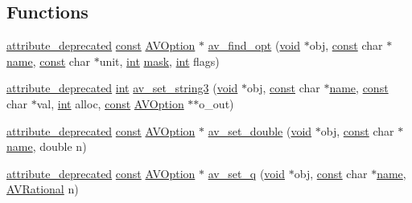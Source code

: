 \subsection*{Functions}
\begin{DoxyCompactItemize}
\item 
\hyperlink{attributes_8h_aa6d076561d3a9eea4729ee632652de02}{attribute\+\_\+deprecated} \hyperlink{getopt1_8c_a2c212835823e3c54a8ab6d95c652660e}{const} \hyperlink{struct_a_v_option}{A\+V\+Option} $\ast$ \hyperlink{group__avoptions_gaa24cb225a282495b9f44377faac5b73f}{av\+\_\+find\+\_\+opt} (\hyperlink{sound_8c_ae35f5844602719cf66324f4de2a658b3}{void} $\ast$obj, \hyperlink{getopt1_8c_a2c212835823e3c54a8ab6d95c652660e}{const} char $\ast$\hyperlink{lib_2expat_8h_a1b49b495b59f9e73205b69ad1a2965b0}{name}, \hyperlink{getopt1_8c_a2c212835823e3c54a8ab6d95c652660e}{const} char $\ast$unit, \hyperlink{xmltok_8h_a5a0d4a5641ce434f1d23533f2b2e6653}{int} \hyperlink{structmask}{mask}, \hyperlink{xmltok_8h_a5a0d4a5641ce434f1d23533f2b2e6653}{int} flags)
\item 
\hyperlink{attributes_8h_aa6d076561d3a9eea4729ee632652de02}{attribute\+\_\+deprecated} \hyperlink{xmltok_8h_a5a0d4a5641ce434f1d23533f2b2e6653}{int} \hyperlink{group__avoptions_gaef3d3cd17236e8a38d95c8a13031ba80}{av\+\_\+set\+\_\+string3} (\hyperlink{sound_8c_ae35f5844602719cf66324f4de2a658b3}{void} $\ast$obj, \hyperlink{getopt1_8c_a2c212835823e3c54a8ab6d95c652660e}{const} char $\ast$\hyperlink{lib_2expat_8h_a1b49b495b59f9e73205b69ad1a2965b0}{name}, \hyperlink{getopt1_8c_a2c212835823e3c54a8ab6d95c652660e}{const} char $\ast$val, \hyperlink{xmltok_8h_a5a0d4a5641ce434f1d23533f2b2e6653}{int} alloc, \hyperlink{getopt1_8c_a2c212835823e3c54a8ab6d95c652660e}{const} \hyperlink{struct_a_v_option}{A\+V\+Option} $\ast$$\ast$o\+\_\+out)
\item 
\hyperlink{attributes_8h_aa6d076561d3a9eea4729ee632652de02}{attribute\+\_\+deprecated} \hyperlink{getopt1_8c_a2c212835823e3c54a8ab6d95c652660e}{const} \hyperlink{struct_a_v_option}{A\+V\+Option} $\ast$ \hyperlink{group__avoptions_ga931434cfd1e6b54bcd3152c0c417b306}{av\+\_\+set\+\_\+double} (\hyperlink{sound_8c_ae35f5844602719cf66324f4de2a658b3}{void} $\ast$obj, \hyperlink{getopt1_8c_a2c212835823e3c54a8ab6d95c652660e}{const} char $\ast$\hyperlink{lib_2expat_8h_a1b49b495b59f9e73205b69ad1a2965b0}{name}, double n)
\item 
\hyperlink{attributes_8h_aa6d076561d3a9eea4729ee632652de02}{attribute\+\_\+deprecated} \hyperlink{getopt1_8c_a2c212835823e3c54a8ab6d95c652660e}{const} \hyperlink{struct_a_v_option}{A\+V\+Option} $\ast$ \hyperlink{group__avoptions_gacbcdd7534efded7e6aa546916714aaad}{av\+\_\+set\+\_\+q} (\hyperlink{sound_8c_ae35f5844602719cf66324f4de2a658b3}{void} $\ast$obj, \hyperlink{getopt1_8c_a2c212835823e3c54a8ab6d95c652660e}{const} char $\ast$\hyperlink{lib_2expat_8h_a1b49b495b59f9e73205b69ad1a2965b0}{name}, \hyperlink{struct_a_v_rational}{A\+V\+Rational} n)
$$
\end{DoxyCompactItemize}
